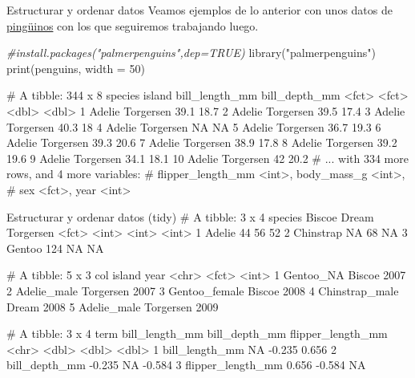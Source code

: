 \documentclass[
  ignorenonframetext,
  aspectratio=169]{beamer}
\newenvironment{Shaded}{\begin{snugshade}}{\end{snugshade}}
\newcommand{\AttributeTok}[1]{\textcolor[rgb]{0.77,0.63,0.00}{#1}}
\newcommand{\CommentTok}[1]{\textcolor[rgb]{0.56,0.35,0.01}{\textit{#1}}}
\newcommand{\DecValTok}[1]{\textcolor[rgb]{0.00,0.00,0.81}{#1}}
\newcommand{\FunctionTok}[1]{\textcolor[rgb]{0.00,0.00,0.00}{#1}}
\newcommand{\NormalTok}[1]{#1}
\newcommand{\StringTok}[1]{\textcolor[rgb]{0.31,0.60,0.02}{#1}}
\let\oldverbatim\verbatim
\let\endoldverbatim\endverbatim
\renewenvironment{verbatim}{\tiny\oldverbatim}{\endoldverbatim}
\begin{document}
\begin{frame}[fragile]{Estructurar y ordenar datos}
\protect\hypertarget{estructurar-y-ordenar-datos}{}
Veamos ejemplos de lo anterior con unos datos de
\href{https://allisonhorst.github.io/palmerpenguins/}{pingüinos} con los
que seguiremos trabajando luego.

\begin{Shaded}
\begin{Highlighting}[]
\CommentTok{\#install.packages("palmerpenguins",dep=TRUE)}
\FunctionTok{library}\NormalTok{(}\StringTok{"palmerpenguins"}\NormalTok{)}
\FunctionTok{print}\NormalTok{(penguins, }\AttributeTok{width =} \DecValTok{50}\NormalTok{)}
\end{Highlighting}
\end{Shaded}

\begin{verbatim}
# A tibble: 344 x 8
   species island    bill_length_mm bill_depth_mm
   <fct>   <fct>              <dbl>         <dbl>
 1 Adelie  Torgersen           39.1          18.7
 2 Adelie  Torgersen           39.5          17.4
 3 Adelie  Torgersen           40.3          18  
 4 Adelie  Torgersen           NA            NA  
 5 Adelie  Torgersen           36.7          19.3
 6 Adelie  Torgersen           39.3          20.6
 7 Adelie  Torgersen           38.9          17.8
 8 Adelie  Torgersen           39.2          19.6
 9 Adelie  Torgersen           34.1          18.1
10 Adelie  Torgersen           42            20.2
# ... with 334 more rows, and 4 more variables:
#   flipper_length_mm <int>, body_mass_g <int>,
#   sex <fct>, year <int>
\end{verbatim}
\end{frame}

\begin{frame}[fragile]{Estructurar y ordenar datos (tidy)}
\protect\hypertarget{estructurar-y-ordenar-datos-tidy-1}{}
\begin{verbatim}
# A tibble: 3 x 4
  species   Biscoe Dream Torgersen
  <fct>      <int> <int>     <int>
1 Adelie        44    56        52
2 Chinstrap     NA    68        NA
3 Gentoo       124    NA        NA
\end{verbatim}

\begin{verbatim}
# A tibble: 5 x 3
  col            island     year
  <chr>          <fct>     <int>
1 Gentoo_NA      Biscoe     2007
2 Adelie_male    Torgersen  2007
3 Gentoo_female  Biscoe     2008
4 Chinstrap_male Dream      2008
5 Adelie_male    Torgersen  2009
\end{verbatim}

\begin{verbatim}
# A tibble: 3 x 4
  term              bill_length_mm bill_depth_mm flipper_length_mm
  <chr>                      <dbl>         <dbl>             <dbl>
1 bill_length_mm            NA            -0.235             0.656
2 bill_depth_mm             -0.235        NA                -0.584
3 flipper_length_mm          0.656        -0.584            NA    
\end{verbatim}
\end{frame}
\end{document}
